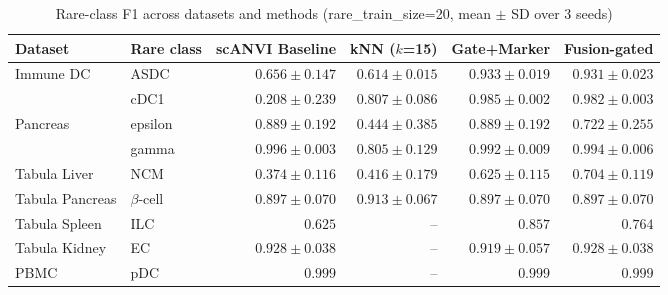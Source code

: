\begin{table}[h]
\centering
\small
\caption{Rare-class F1 across datasets and methods (rare\_train\_size=20, mean $\pm$ SD over 3 seeds)}
\begin{tabular}{llrrrr}
\hline
Dataset & Rare class & scANVI Baseline & kNN ($k$=15) & \textbf{Gate+Marker} & \textbf{Fusion-gated} \\
\hline
Immune DC & ASDC & $0.656 \pm 0.147$ & $0.614 \pm 0.015$ & \textbf{$0.933 \pm 0.019$} & $0.931 \pm 0.023$ \\
 & cDC1 & $0.208 \pm 0.239$ & $0.807 \pm 0.086$ & \textbf{$0.985 \pm 0.002$} & $0.982 \pm 0.003$ \\
\hline
Pancreas & epsilon & \textbf{$0.889 \pm 0.192$} & $0.444 \pm 0.385$ & \textbf{$0.889 \pm 0.192$} & $0.722 \pm 0.255$ \\
 & gamma & \textbf{$0.996 \pm 0.003$} & $0.805 \pm 0.129$ & $0.992 \pm 0.009$ & $0.994 \pm 0.006$ \\
\hline
Tabula Liver & NCM & $0.374 \pm 0.116$ & $0.416 \pm 0.179$ & $0.625 \pm 0.115$ & \textbf{$0.704 \pm 0.119$} \\
\hline
Tabula Pancreas & $\beta$-cell & $0.897 \pm 0.070$ & \textbf{$0.913 \pm 0.067$} & $0.897 \pm 0.070$ & $0.897 \pm 0.070$ \\
\hline
Tabula Spleen & ILC & $0.625$ & -- & \textbf{$0.857$} & $0.764$ \\
\hline
Tabula Kidney & EC & \textbf{$0.928 \pm 0.038$} & -- & $0.919 \pm 0.057$ & \textbf{$0.928 \pm 0.038$} \\
\hline
PBMC & pDC & \textbf{$0.999$} & -- & \textbf{$0.999$} & \textbf{$0.999$} \\
\hline
\end{tabular}
\label{tab:main_results}
\end{table}

